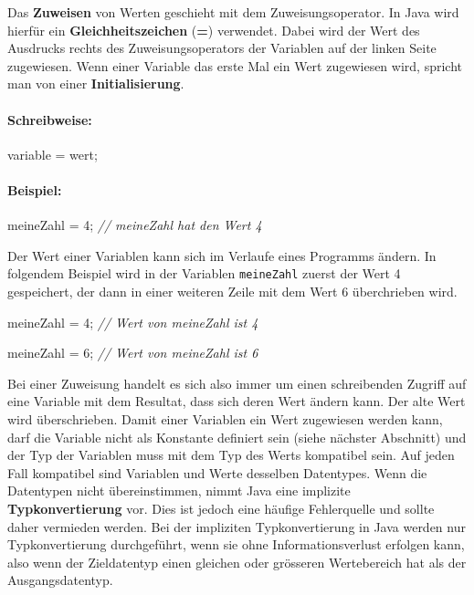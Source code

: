 \documentclass[10pt,paper=17cm:22cm, twoside=true, DIV=14]{scrbook}
\newenvironment {Shaded}
        {\begin{mdframed}[style=code] }
         {\end{mdframed}}
\newcommand{\DecValTok}[1]{\textcolor[rgb]{0.4,0.4,0.4}{{#1}}}
\newcommand{\CommentTok}[1]{\textcolor[RGB]{128,128,128}{\textit{#1}}}
\newcommand{\NormalTok}[1]{#1}
\begin{document}
Das \textbf{Zuweisen} von Werten geschieht mit dem Zuweisungsoperator.
In Java wird hierfür ein \textbf{Gleichheitszeichen} (\textbf{=})
verwendet. Dabei wird der Wert des Ausdrucks rechts des
Zuweisungsoperators der Variablen auf der linken Seite zugewiesen. Wenn
einer Variable das erste Mal ein Wert zugewiesen wird, spricht man von
einer \textbf{Initialisierung}.

\paragraph{Schreibweise:}\label{schreibweise-1}

\begin{Shaded}
\begin{Highlighting}[]
\NormalTok{variable = wert;}
\end{Highlighting}
\end{Shaded}

\paragraph{Beispiel:}\label{beispiel-1}

\begin{Shaded}
\begin{Highlighting}[]
\NormalTok{meineZahl = }\DecValTok{4}\NormalTok{;}
\CommentTok{// meineZahl hat den Wert 4}
\end{Highlighting}
\end{Shaded}

Der Wert einer Variablen kann sich im Verlaufe eines Programms ändern.
In folgendem Beispiel wird in der Variablen \texttt{meineZahl} zuerst
der Wert 4 gespeichert, der dann in einer weiteren Zeile mit dem Wert 6
überchrieben wird.

\begin{Shaded}
\begin{Highlighting}[]
\NormalTok{meineZahl = }\DecValTok{4}\NormalTok{;}
\CommentTok{// Wert von meineZahl ist 4}

\NormalTok{meineZahl = }\DecValTok{6}\NormalTok{;}
\CommentTok{// Wert von meineZahl ist 6}
\end{Highlighting}
\end{Shaded}

Bei einer Zuweisung handelt es sich also immer um einen schreibenden
Zugriff auf eine Variable mit dem Resultat, dass sich deren Wert ändern
kann. Der alte Wert wird überschrieben. Damit einer Variablen ein Wert
zugewiesen werden kann, darf die Variable nicht als Konstante definiert
sein (siehe nächster Abschnitt) und der Typ der Variablen muss mit dem
Typ des Werts kompatibel sein. Auf jeden Fall kompatibel sind Variablen
und Werte desselben Datentypes. Wenn die Datentypen nicht
übereinstimmen, nimmt Java eine implizite \textbf{Typkonvertierung} vor.
Dies ist jedoch eine häufige Fehlerquelle und sollte daher vermieden
werden. Bei der impliziten Typkonvertierung in Java werden nur
Typkonvertierung durchgeführt, wenn sie ohne Informationsverlust
erfolgen kann, also wenn der Zieldatentyp einen gleichen oder grösseren
Wertebereich hat als der Ausgangsdatentyp.
\end{document}
